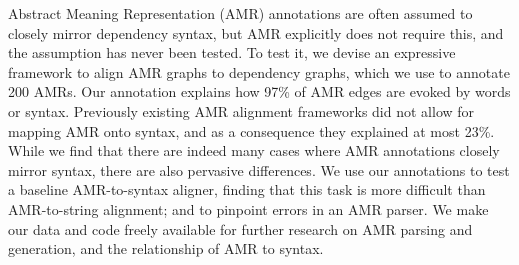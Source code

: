 Abstract Meaning Representation (AMR) annotations are often assumed to closely mirror dependency syntax, but AMR explicitly does not require this, and the assumption has never been tested. To test it, we devise an expressive framework to align AMR graphs to dependency graphs, which we use to annotate 200 AMRs. Our annotation explains how 97\% of AMR edges are evoked by words or syntax. Previously existing AMR alignment frameworks did not allow for mapping AMR onto syntax, and as a consequence they explained at most 23\%. While we find that there are indeed many cases where AMR annotations closely mirror syntax, there are also pervasive differences. We use our annotations to test a baseline AMR-to-syntax aligner, finding that this task is more difficult than AMR-to-string alignment; and to pinpoint errors in an AMR parser. We make our data and code freely available for further research on AMR parsing and generation, and the relationship of AMR to syntax.
